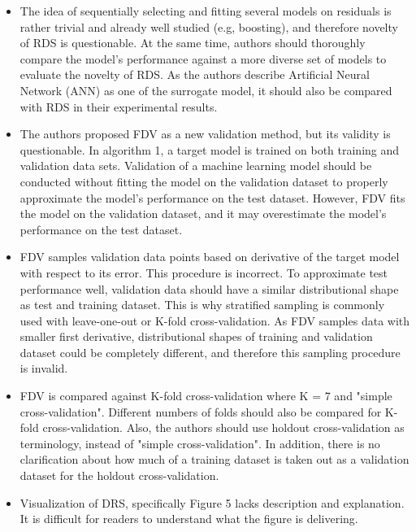 \documentclass[a4paper, 9pt]{scrartcl}
\begin{document}
\begin{itemize}
    \item The idea of sequentially selecting and fitting several models on
        residuals is rather trivial and already well studied (e.g, boosting),
        and therefore novelty of RDS is questionable. At the same time, authors
        should thoroughly compare the model's performance against a more diverse
        set of models to evaluate the novelty of RDS. As the authors describe
        Artificial Neural Network (ANN) as one of the surrogate model, it should
        also be compared with RDS in their experimental results.

    \item The authors proposed FDV as a new validation method, but its validity
        is questionable. In algorithm 1, a target model is trained on both
        training and validation data sets. Validation of a machine learning
        model should be conducted without fitting the model on the validation
        dataset to properly approximate the model's performance on the test
        dataset. However, FDV fits the model on the validation dataset, and it
        may overestimate the model's performance on the test dataset.

    \item  FDV samples validation data points based on derivative of the target
        model with respect to its error. This procedure is incorrect. To
        approximate test performance well, validation data should have a similar
        distributional shape as test and training dataset. This is why
        stratified sampling is commonly used with leave-one-out or K-fold
        cross-validation. As FDV samples data with smaller first derivative,
        distributional shapes of training and validation dataset could be completely
        different, and therefore this sampling procedure is invalid.

    \item FDV is compared against K-fold cross-validation where K = 7 and
        "simple cross-validation". Different numbers of folds should also be
        compared for K-fold cross-validation. Also, the authors should use
        holdout cross-validation as terminology, instead of "simple
        cross-validation". In addition, there is no clarification about how much
        of a training dataset is taken out as a validation dataset for the holdout
        cross-validation.

    \item Visualization of DRS, specifically Figure 5 lacks description and
        explanation. It is difficult for readers to understand what the
        figure is delivering.


\end{itemize}
\end{document}
